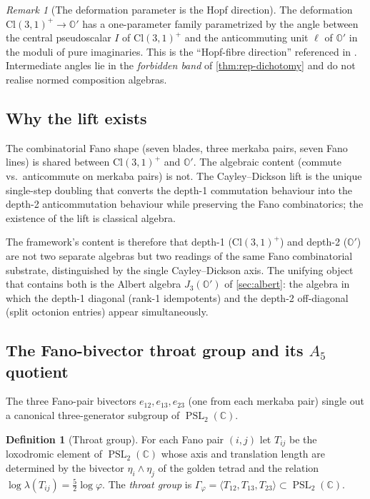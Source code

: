 \documentclass[11pt,a4paper]{article}
\theoremstyle{plain}
\theoremstyle{definition}
\newtheorem{definition}[theorem]{Definition}
\theoremstyle{remark}
\newtheorem{remark}[theorem]{Remark}
\numberwithin{equation}{section}
\providecommand{\Cl}{\mathrm{Cl}}
\providecommand{\C}{\mathbb{C}}
\providecommand{\Os}{\mathbb{O}'}
\providecommand{\vp}{\varphi}
\providecommand{\PSL}{\operatorname{PSL}}
\begin{document}
\begin{remark}[The deformation parameter is the Hopf direction]
\label{rmk:hopf-direction}
The deformation $\Cl(3,1)^+ \to \Os$ has a one-parameter family
parametrized by the angle between the central pseudoscalar $I$ of
$\Cl(3,1)^+$ and the anticommuting unit $\ell$ of $\Os$ in the
moduli of pure imaginaries.  This is the ``Hopf-fibre direction''
referenced in \cite{cd-lift}.  Intermediate angles lie in the
\emph{forbidden band} of \cref{thm:rep-dichotomy} and do not
realise normed composition algebras.
\end{remark}

\subsection{Why the lift exists}

The combinatorial Fano shape (seven blades, three merkaba pairs,
seven Fano lines) is shared between $\Cl(3,1)^+$ and $\Os$.  The
algebraic content (commute vs.\ anticommute on merkaba pairs) is
not.  The Cayley--Dickson lift is the unique
single-step doubling that converts the depth-1 commutation
behaviour into the depth-2 anticommutation behaviour while
preserving the Fano combinatorics; the existence of the lift is
classical algebra.

The framework's content is therefore that depth-1 ($\Cl(3,1)^+$)
and depth-2 ($\Os$) are not two separate algebras but two readings
of the same Fano combinatorial substrate, distinguished by the
single Cayley--Dickson axis.  The unifying object that contains
both is the Albert algebra $J_3(\Os)$ of \cref{sec:albert}: the
algebra in which the depth-1 diagonal (rank-1 idempotents) and the
depth-2 off-diagonal (split octonion entries) appear simultaneously.

\subsection{The Fano-bivector throat group and its \texorpdfstring{$A_5$}{A5} quotient}
\label{sec:throat-a5}

The three Fano-pair bivectors $e_{12}, e_{13}, e_{23}$ (one from
each merkaba pair) single out a canonical
three-generator subgroup of $\PSL_2(\C)$.

\begin{definition}[Throat group]
\label{def:throat-group}
For each Fano pair $(i,j)$ let $T_{ij}$ be the loxodromic
element of $\PSL_2(\C)$ whose axis and translation length are
determined by the bivector $\eta_i \wedge \eta_j$ of the golden
tetrad and the relation $\log\lambda(T_{ij}) = \tfrac52\log\vp$.
The \emph{throat group} is $\Gamma_\vp = \langle T_{12}, T_{13},
T_{23}\rangle \subset \PSL_2(\C)$.
\end{definition}
\end{document}
